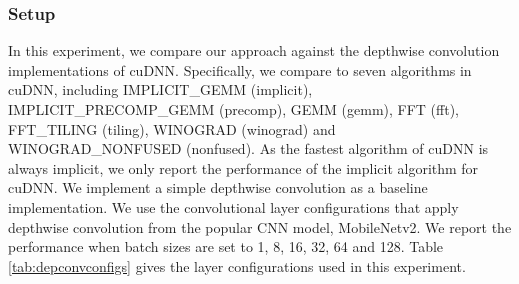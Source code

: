 %	
%


\subsubsection{Setup} In this experiment, we compare our approach against the depthwise convolution implementations of cuDNN. Specifically, we compare to seven algorithms in cuDNN, including IMPLICIT\_GEMM (implicit), IMPLICIT\_PRECOMP\_GEMM (precomp), GEMM (gemm), FFT (fft), FFT\_TILING (tiling), WINOGRAD (winograd) and WINOGRAD\_NONFUSED (nonfused). 
As the fastest algorithm of cuDNN is always implicit, we only report the performance of the implicit algorithm for cuDNN. 
We implement a simple depthwise convolution as a baseline implementation. 
We use the convolutional layer configurations that apply depthwise convolution from the popular CNN model, MobileNetv2. 
We report the performance when batch sizes are set to 1, 8, 16, 32, 64 and 128. 
Table \ref{tab:depconvconfigs} gives the layer configurations used in this experiment.

